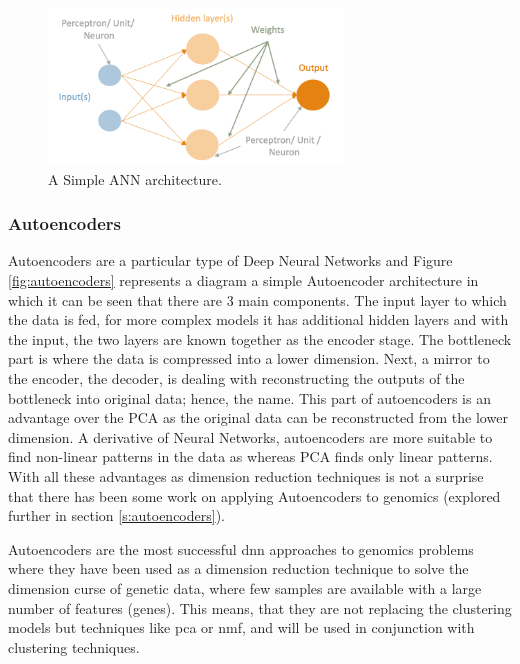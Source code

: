 \begin{figure}[!htb]
  \centering\includegraphics[width=0.7\textwidth,height=0.7\textheight,keepaspectratio]{Images/ANN/Basic_ANN.png}
    \caption{A Simple ANN architecture. }
    \label{fig:ann_basic}
\end{figure}
\FloatBarrier


\subsubsection{Autoencoders} \label{s:autoencod_overview}

Autoencoders are a particular type of Deep Neural Networks and Figure \ref{fig:autoencoders} represents a diagram a simple Autoencoder architecture in which it can be seen that there are 3 main components. The input layer to which the data is fed, for more complex models it has additional hidden layers and with the input, the two layers are known together as the encoder stage. The bottleneck part is where the data is compressed into a lower dimension. Next, a mirror to the encoder, the decoder, is dealing with reconstructing the outputs of the bottleneck into original data; hence, the name. This part of autoencoders is an advantage over the PCA as the original data can be reconstructed from the lower dimension. A derivative of Neural Networks, autoencoders are more suitable to find non-linear patterns in the data as whereas PCA finds only linear patterns. With all these advantages as dimension reduction techniques is not a surprise that there has been some work on applying Autoencoders to genomics (explored further in section \ref{s:autoencoders}).

Autoencoders are the most successful \acrshort{dnn} approaches to genomics problems where they have been used as a dimension reduction technique to solve the dimension curse of genetic data, where few samples are available with a large number of features (genes). This means, that they are not replacing the clustering models but techniques like \acrfull{pca} or \acrfull{nmf}, and will be used in conjunction with clustering techniques.

